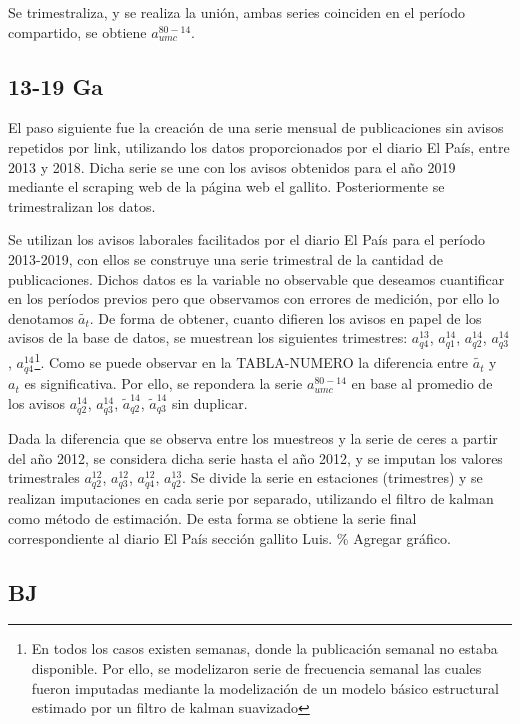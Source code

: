 \documentclass[12pt,twoside]{reedthesis}
\begin{document}
Se trimestraliza, y se realiza la unión, ambas series coinciden en el período compartido, se obtiene \(a_{umc}^{80-14}\).

\hypertarget{ga}{%
\subsection{13-19 Ga}\label{ga}}

El paso siguiente fue la creación de una serie mensual de publicaciones sin avisos repetidos por link, utilizando los datos proporcionados por el diario El País, entre 2013 y 2018. Dicha serie se une con los avisos obtenidos para el año 2019 mediante el scraping web de la página web el gallito. Posteriormente se trimestralizan los datos.

Se utilizan los avisos laborales facilitados por el diario El País para el período 2013-2019, con ellos se construye una serie trimestral de la cantidad de publicaciones.
Dichos datos es la variable no observable que deseamos cuantificar en los períodos previos pero que observamos con errores de medición, por ello lo denotamos \(\tilde{a_t}\). De forma de obtener, cuanto difieren los avisos en papel de los avisos de la base de datos, se muestrean los siguientes trimestres: \(a_{q4}^{13}\), \(a_{q1}^{14}\), \(a_{q2}^{14}\), \(a_{q3}^{14}\), \(a_{q4}^{14}\)\footnote{En todos los casos existen semanas, donde la publicación semanal no estaba disponible. Por ello, se modelizaron serie de frecuencia semanal las cuales fueron imputadas mediante la modelización de un modelo básico estructural estimado por un filtro de kalman suavizado}. Como se puede observar en la TABLA-NUMERO la diferencia entre \(\tilde{a_t}\) y \({a_t}\) es significativa. Por ello, se repondera la serie \(a_{umc}^{80-14}\) en base al promedio de los avisos \(a_{q2}^{14}\), \(a_{q3}^{14}\), \(\tilde{a}_{q2}^{14}\), \(\tilde{a}_{q3}^{14}\) sin duplicar.

Dada la diferencia que se observa entre los muestreos y la serie de ceres a partir del año 2012, se considera dicha serie hasta el año 2012, y se imputan los valores trimestrales \(a_{q2}^{12}\), \(a_{q3}^{12}\), \(a_{q4}^{12}\), \(a_{q2}^{13}\). Se divide la serie en estaciones (trimestres) y se realizan imputaciones en cada serie por separado, utilizando el filtro de kalman como método de estimación. De esta forma se obtiene la serie final correspondiente al diario El País sección gallito Luis.
\% Agregar gráfico.

\hypertarget{bj}{%
\subsection{BJ}\label{bj}}
\end{document}

